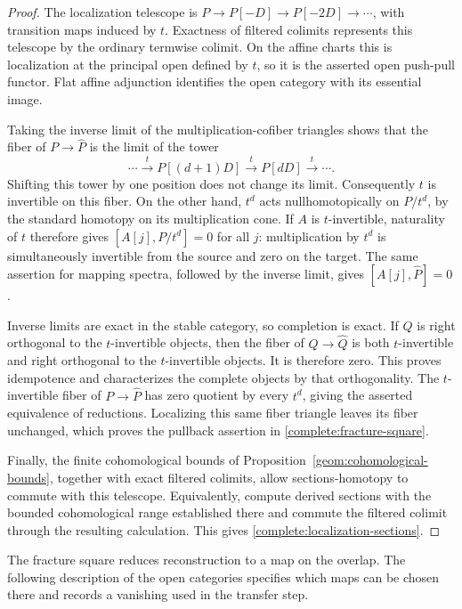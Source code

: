 \begin{proof}
The localization telescope is
$P\to P[-D]\to P[-2D]\to\cdots$, with transition maps induced by $t$.
Exactness of filtered colimits represents this telescope by the ordinary
termwise colimit. On the affine charts this is localization at the
principal open defined by $t$, so it is the asserted open push-pull
functor. Flat affine adjunction identifies the open category with its
essential image.

Taking the inverse limit of the multiplication-cofiber triangles shows
that the fiber of $P\to\widehat P$ is the limit of the tower
\[
 \cdots\xrightarrow{t}P[(d+1)D]
 \xrightarrow{t}P[dD]\xrightarrow{t}\cdots.
\]
Shifting this tower by one position does not change its limit.
Consequently $t$ is invertible on this fiber. On the other hand,
$t^d$ acts nullhomotopically on $P/t^d$, by the standard homotopy on
its multiplication cone. If $A$ is $t$-invertible, naturality of $t$
therefore gives $[A[j],P/t^d]=0$ for all $j$: multiplication by $t^d$
is simultaneously invertible from the source and zero on the target.
The same assertion for mapping spectra, followed by the inverse limit,
gives $[A[j],\widehat P]=0$.

Inverse limits are exact in the stable category, so completion is exact.
If $Q$ is right orthogonal to the $t$-invertible objects, then the fiber
of $Q\to\widehat Q$ is both $t$-invertible and right orthogonal to
the $t$-invertible objects. It is therefore zero. This proves
idempotence and characterizes the complete objects by that
orthogonality. The $t$-invertible fiber of $P\to\widehat P$ has zero
quotient by every $t^d$, giving the asserted equivalence of reductions.
Localizing this same fiber triangle leaves its fiber unchanged, which
proves the pullback assertion in \eqref{complete:fracture-square}.

Finally, the finite cohomological bounds of
Proposition~\ref{geom:cohomological-bounds}, together with exact filtered
colimits, allow sections-homotopy to commute with this telescope.
Equivalently, compute derived sections with the bounded cohomological
range established there and commute the filtered colimit through the
resulting calculation. This gives
\eqref{complete:localization-sections}.
\end{proof}

The fracture square reduces reconstruction to a map on the overlap.
The following description of the open categories specifies which maps
can be chosen there and records a vanishing used in the transfer step.

